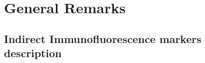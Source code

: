 \documentclass[biblatexBackend=bibtex]{tumthesis}
\begin{document}
\chapter{General Remarks}
\label{Appendix-general-remarks}


\section{Indirect Immunofluorescence markers description}
\label{sec:appendix:if_markers}


\backmatter


\listoffigures

\vspace*{1.5cm}

\listoftables





\printindex

\printglossary[type=\acronymtype]

\printbibliography[heading=bibintoc]

\listoffixmes
%
\end{document}
